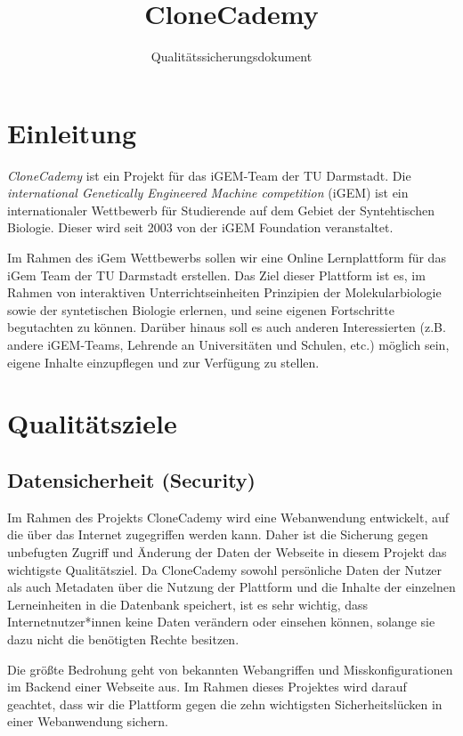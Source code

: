 \documentclass[accentcolor=tud0b,12pt,paper=a4]{tudreport}
\title{CloneCademy}
\subtitle{Qualitätssicherungsdokument}
\begin{document}
\maketitle
\tableofcontents

\chapter{Einleitung}
\emph{CloneCademy} ist ein Projekt für das iGEM-Team der TU Darmstadt. Die \emph{international Genetically Engineered Machine competition} (iGEM) ist ein internationaler Wettbewerb für Studierende auf dem Gebiet der Syntehtischen Biologie.
Dieser wird seit 2003 von der iGEM Foundation veranstaltet. 

Im Rahmen des iGem Wettbewerbs sollen wir eine Online Lernplattform für das iGem Team der TU Darmstadt erstellen. Das Ziel dieser Plattform ist es, im Rahmen von interaktiven Unterrichtseinheiten Prinzipien der Molekularbiologie sowie der syntetischen Biologie erlernen, und seine eigenen Fortschritte begutachten zu können. Darüber hinaus soll es auch anderen Interessierten (z.B. andere iGEM-Teams, Lehrende an Universitäten und Schulen, etc.) möglich sein, eigene Inhalte einzupflegen und zur Verfügung zu stellen.

\chapter{Qualitätsziele}
\section{Datensicherheit (Security)}

Im Rahmen des Projekts CloneCademy wird eine Webanwendung entwickelt, auf die über das Internet zugegriffen werden kann. Daher ist die Sicherung gegen unbefugten Zugriff und Änderung der Daten der Webseite in diesem Projekt das wichtigste Qualitätsziel. Da CloneCademy sowohl persönliche Daten der Nutzer als auch Metadaten über die Nutzung der Plattform und die Inhalte der einzelnen Lerneinheiten in die Datenbank speichert, ist es sehr wichtig, dass Internetnutzer*innen keine Daten verändern oder einsehen können, solange sie dazu nicht die benötigten Rechte besitzen.
		
Die größte Bedrohung geht von bekannten Webangriffen und Misskonfigurationen im Backend einer Webseite aus. Im Rahmen dieses Projektes wird darauf geachtet, dass wir die Plattform gegen die zehn wichtigsten Sicherheitslücken in einer Webanwendung sichern.
\end{document}
